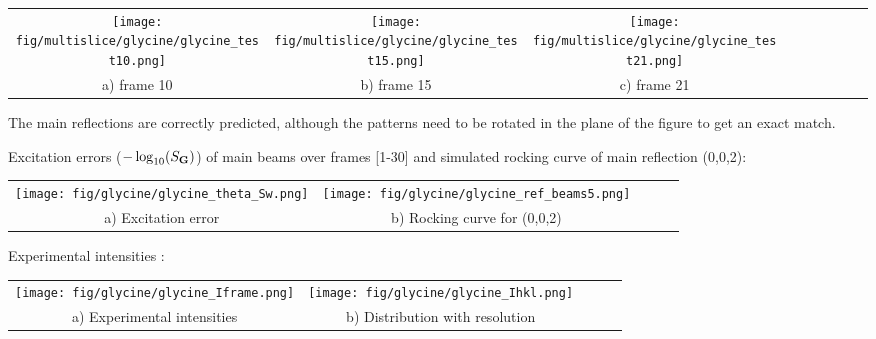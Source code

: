 \documentclass[a0paper,portrait,fontscale=0.34]{baposter}
\begin{document}
\begin{poster}
{\begin{multicols}{2}
	\begin{tabular}{@{}c@{ }c@{ }c@{ }c@{ }c@{ }c@{ }c@{ }c@{ }c@{ }}
		\texttt{[image: fig/multislice/glycine/glycine\_test10.png]}&
		\texttt{[image: fig/multislice/glycine/glycine\_test15.png]}&
		\texttt{[image: fig/multislice/glycine/glycine\_test21.png]}\\
			 a) frame 10 & \smaller b) frame 15 & \smaller c) frame 21
	\end{tabular}

\vspace{1em}
The main reflections are correctly predicted, although the patterns need to be rotated
in the plane of the figure to get an exact match.

Excitation errors ($-\log_{10}(S_{\mathbf G})$) of main beams over frames [1-30] and
simulated rocking curve of main reflection (0,0,2):

\begin{tabular}{@{}c@{ }c@{ }c@{ }c@{ }c@{ }}
	\hspace{1.5em}
	\texttt{[image: fig/glycine/glycine\_theta\_Sw.png]}&
	\texttt{[image: fig/glycine/glycine\_ref\_beams5.png]}\\
		 \smaller a) Excitation error & \smaller b) Rocking curve for (0,0,2)
\end{tabular}

\vspace{1em}
Experimental intensities :

\begin{tabular}{@{}c@{ }c@{ }c@{ }c@{ }c@{ }}
	\hspace{1.5em}
	\texttt{[image: fig/glycine/glycine\_Iframe.png]}&
	\texttt{[image: fig/glycine/glycine\_Ihkl.png]}\\
		\smaller a) Experimental intensities & \smaller b) Distribution with resolution
\end{tabular}

\end{multicols}

\vspace{0.3em}
}


\end{poster}
\end{document}
